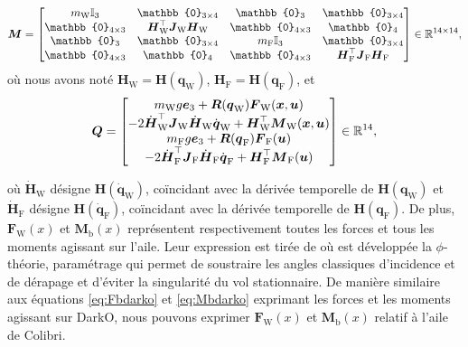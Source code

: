 \begin{align}
    \boldsymbol{M} = \begin{bmatrix}
        m_{\text{W}} \mathbb{I}_{3} & \mathbb{0}_{3 \times 4} & \mathbb{0}_{3} & \mathbb{0}_{3 \times 4}\\
        \mathbb{0}_{4 \times 3} & \boldsymbol{H}_{\text{W}}^\top \boldsymbol{J}_{\text{W}} \boldsymbol{H}_{\text{W}} & \mathbb{0}_{4 \times 3} & \mathbb{0}_{4}\\
        \mathbb{0}_{3} & \mathbb{0}_{3 \times 4} & m_{\text{F}} \mathbb{I}_{3} & \mathbb{0}_{3 \times 4} \\
        \mathbb{0}_{4 \times 3} & \mathbb{0}_{4 } & \mathbb{0}_{4 \times 3} & \boldsymbol{H}_{\text{F}}^\top \boldsymbol{J}_{\text{F}} \boldsymbol{H}_{\text{F}}    \end{bmatrix}\in \real^{14\times14},
\end{align}
où nous avons noté $\boldsymbol{H}_{\text{W}} = \boldsymbol{H}(\boldsymbol{q}_{\text{W}})$, $\boldsymbol{H}_{\text{F}} = \boldsymbol{H}(\boldsymbol{q}_{\text{F}})$, et
\begin{align}
    \label{eq:Q}
    \boldsymbol{Q} = \begin{bmatrix}
            m_{\text{W}} g \boldsymbol{e}_3 + \boldsymbol{R}(\boldsymbol{q}_{\text{W}}) \boldsymbol{F}_{\text{W}}(\boldsymbol{x}, \boldsymbol{u})\\
            -2\dot{\boldsymbol{H}}_{\text{W}}^\top \boldsymbol{J}_{\text{W}} \dot{\boldsymbol{H}}_{\text{W}} \dot{\boldsymbol{q}}_{\text{W}} + \boldsymbol{H}_{\text{W}}^\top \boldsymbol{M}_{\text{W}}(\boldsymbol{x}, \boldsymbol{u})\\
            m_{\text{F}} g \boldsymbol{e}_3 + \boldsymbol{R}(\boldsymbol{q}_{\text{F}}) \boldsymbol{F}_{\text{F}}(\boldsymbol{u})\\
            -2\dot{\boldsymbol{H}}_{\text{F}}^\top \boldsymbol{J}_{\text{F}} \dot{\boldsymbol{H}}_{\text{F}} \dot{\boldsymbol{q}}_{\text{F}} + \boldsymbol{H}_{\text{F}}^\top \boldsymbol{M}_{\text{F}}(\boldsymbol{u})\\
        \end{bmatrix} \in {\mathbb R}^{14},
\end{align}


où $\dot{\boldsymbol{H}}_{\text{W}}$ désigne $\boldsymbol{H}(\dot{\boldsymbol{q}}_{\text{W}})$, coïncidant avec la dérivée temporelle de $\boldsymbol{H}(\boldsymbol{q}_{\text{W}})$ et $\dot{\boldsymbol{H}}_{\text{F}}$ désigne $\boldsymbol{H}(\dot{\boldsymbol{q}}_{\text{F}})$, coïncidant avec la dérivée temporelle de $\boldsymbol{H}(\boldsymbol{q}_{\text{F}})$. De plus, $\boldsymbol{F}_{\text{W}}(x)$ et $\boldsymbol{M}_{\text{b}}(x)$ représentent respectivement toutes les forces et tous les moments agissant sur l'aile. Leur expression est tirée de \cite[équations (45) et (57)]{lustosaHal-03035938} où est développée la $\phi$-théorie, paramétrage qui permet de soustraire les angles classiques d'incidence et de dérapage et d'éviter la singularité du vol stationnaire. De manière similaire aux équations \eqref{eq:Fbdarko} et \eqref{eq:Mbdarko} exprimant les forces et les moments agissant sur DarkO, nous pouvons exprimer $\boldsymbol{F}_{\text{W}}(x)$ et $\boldsymbol{M}_{\text{b}}(x)$ relatif à l'aile de Colibri.

